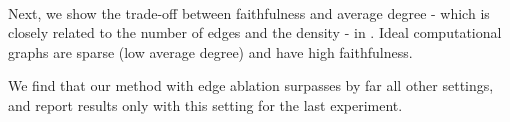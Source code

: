 \documentclass{article}
\begin{document}
\paragraph{}Next, we show the trade-off between faithfulness and average degree - which is closely related to the number of edges and the density - in . Ideal computational graphs are sparse (low average degree) and have high faithfulness.

We find that our method with edge ablation surpasses by far all other settings, and report results only with this setting for the last experiment.


\end{document}
